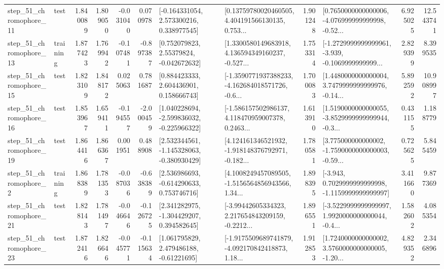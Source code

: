 \begin{tabular}{llrrrrllrlrr}
   step\_51\_chromophore\_11 &      test &      1.840089 &    1.809050 &     -0.031040 &  0.070978 &    [-0.164331054, 2.573300216, 0.338977545] &  [0.13759780020460505, 4.404191566130135, 0.753... &       1.901248 &  [0.7650000000000006, -4.076999999999998, -0.52... &            6.925025 &         12.543741 \\
   step\_51\_chromophore\_13 &  training &      1.877423 &    1.769942 &     -0.107481 & -0.897387 &     [0.752079823, 2.55379824, -0.042672632] &  [1.3300580149683918, 4.136594349160237, -0.527... &       1.753314 &  [-1.2729999999999961, -3.939, -0.1069999999999... &            2.829399 &          8.399535 \\
   step\_51\_chromophore\_15 &      test &      1.823109 &    1.848172 &      0.025063 &  0.781687 &     [0.884423333, 2.604436901, 0.158666743] &  [-1.3590771937388233, -4.162684018571726, -0.6... &       1.700083 &  [1.4480000000000004, 3.7479999999999976, -0.14... &            5.892592 &         10.908997 \\
   step\_51\_chromophore\_16 &      test &      1.853967 &    1.659411 &     -0.194557 & -2.000459 &   [1.040228694, -2.599836032, -0.225966322] &  [-1.586157502986137, 4.118470959007378, 0.2463... &       1.613910 &  [1.5190000000000055, -3.8529999999999944, -0.3... &            0.431155 &          1.188779 \\
   step\_51\_chromophore\_19 &      test &      1.864416 &    1.866367 &      0.001951 &  0.488908 &   [2.532344561, -1.145328063, -0.380930429] &  [4.124161346521932, -1.918148376792971, -0.182... &       1.780581 &  [3.775000000000002, -1.7590000000000003, -0.59... &            0.725625 &          5.845459 \\
    step\_51\_chromophore\_2 &  training &      1.868389 &    1.781353 &     -0.087036 & -0.638389 &    [2.536986693, -0.614290633, 0.753746716] &  [4.1008249457089505, -1.5156564856943566, 1.34... &       1.898395 &  [-3.943, 0.7029999999999998, -1.1159999999999997] &            3.411660 &          9.877369 \\
   step\_51\_chromophore\_21 &      test &      1.828143 &    1.781497 &     -0.046646 & -0.126725 &    [2.341282975, -1.304429207, 0.394582645] &  [-3.99442605334323, 2.217654843209159, -0.2212... &       1.896551 &  [-3.5229999999999997, 1.9920000000000044, -0.4... &            1.582602 &          4.085354 \\
   step\_51\_chromophore\_23 &      test &      1.872416 &    1.826646 &     -0.045771 & -0.115634 &     [1.061795829, 2.479486188, -0.61221695] &  [-1.9175509689741879, -4.092170842418873, 1.18... &       1.912853 &  [1.7240000000000002, 3.5760000000000005, -1.20... &            4.829352 &          2.346896 \\

\end{tabular}
